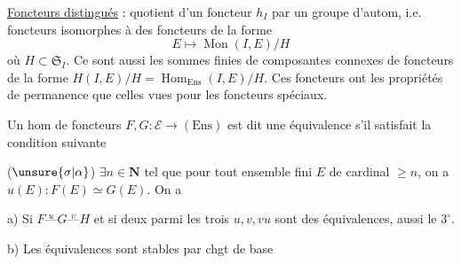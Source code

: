 \uline{Foncteurs distingués} :  quotient d'un foncteur
 $h_I$ par un groupe d'autom, i.e.
foncteurs isomorphes à des  foncteurs de la
forme
\[
E\longmapsto\operatorname{Mon}(I,E)/H
\]
où $H\subset\mathfrak S_I$. Ce sont aussi les sommes
finies de composantes connexes de foncteurs
de la forme $H(I,E)/H=\operatorname{Hom}_{\mathrm{Ens}}(I,E)/H$.
Ces foncteurs ont les  propriétés de
permanence que celles vues pour les
foncteurs spéciaux.


Un hom  de foncteurs $F,G:\mathcal E\longrightarrow(\mathrm{Ens})$
est dit une équivalence s'il satisfait la
condition suivante

($\unsure{\sigma|\alpha}$) $\exists n\in\mathbf N$ tel que pour  tout
ensemble fini $E$  de cardinal $\geq n$, 
on a $u(E):F(E)\simeq G(E)$. On a

a) Si $F\mathrel{\overset{u}{\text{---}}}G\mathrel{\overset{v}{\text{---}}}H$ et si deux parmi les
trois $u,v,vu$ sont des équivalences, aussi le $3^\circ$.

b) Les  équivalences sont stables par
chgt de base

